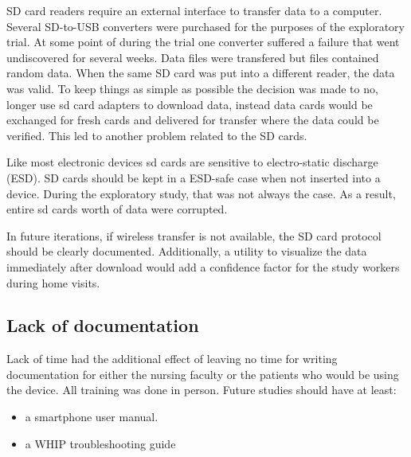 SD card readers require an external interface to transfer data to a computer. Several SD-to-USB converters were purchased for the purposes of the exploratory trial. At some point of during the trial one converter suffered a failure that went undiscovered for several weeks. Data files were transfered but files contained random data. When the same SD card was put into a different reader, the data was valid. To keep things as simple as possible the decision was made to no, longer use sd card adapters to download data, instead data cards would be exchanged for fresh cards and delivered for transfer where the data could be verified. This led to another problem related to the SD cards.

Like most electronic devices sd cards are sensitive to electro-static discharge (ESD). SD cards should be kept in a ESD-safe case when not inserted into a device. During the exploratory study, that was not always the case. 
As a result, entire sd cards worth of data were corrupted.

In future iterations, if wireless transfer is not available, the SD card protocol should be clearly documented. Additionally, a utility to visualize the data immediately after download would add a confidence factor for the study workers during home visits.



\subsection{Lack of documentation}
Lack of time had the additional effect of leaving no time for writing documentation for either the nursing faculty or the patients who would be using the device. All training was done in person. Future studies should have at least:
\begin{itemize}
\item a smartphone user manual.
\item a WHIP troubleshooting guide
\end{itemize}

